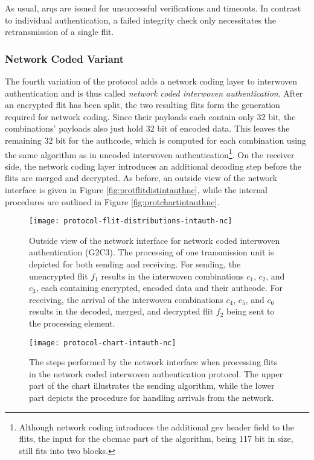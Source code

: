 As usual, \glspl{arq} are issued for unsuccessful verifications and timeouts. In contrast to individual authentication, a failed integrity check only
necessitates the retransmission of a single flit.

\subsubsection{Network Coded Variant}
The fourth variation of the protocol adds a network coding layer to interwoven authentication and is thus called \textit{network coded interwoven
authentication}. After an encrypted flit has been split, the two resulting flits form the generation required for network coding. Since their payloads
each contain only 32 bit, the combinations' payloads also just hold 32 bit of encoded data. This leaves the remaining 32 bit for the authcode, which is
computed for each combination using the same algorithm as in uncoded interwoven authentication\footnote{Although network coding introduces the
additional \gls{gev} header field to the flits, the input for the \gls{cbcmac} part of the algorithm, being 117 bit in size, still fits into two
blocks.}. On the receiver side, the network coding layer introduces an additional decoding step before the flits are merged and decrypted. As before,
an outside view of the network interface is given in Figure \vref{fig:protflitdistintauthnc}, while the internal procedures are outlined in Figure
\vref{fig:protchartintauthnc}.

\begin{figure}
    \centering
    \texttt{[image: protocol-flit-distributions-intauth-nc]}
    \caption[Network coded int. auth., outside view]{Outside view of the network interface for network coded interwoven authentication (G2C3). The
    processing of one transmission unit is depicted for both sending and receiving. For sending, the unencrypted flit $f_1$ results in the interwoven
    combinations $c_1$, $c_2$, and $c_3$, each containing encrypted, encoded data and their authcode. For receiving, the arrival of the interwoven
    combinations $c_4$, $c_5$, and $c_6$ results in the decoded, merged, and decrypted flit $f_2$ being sent to the processing element.}
    \label{fig:protflitdistintauthnc}
\end{figure}

\begin{figure}
    \centering
    \texttt{[image: protocol-chart-intauth-nc]}
    \caption[Network coded int. auth., detailed procedure]{The steps performed by the network interface when processing flits in the network coded
    interwoven authentication protocol. The upper part of the chart illustrates the sending algorithm, while the lower part depicts the procedure for
    handling arrivals from the network.}
    \label{fig:protchartintauthnc}
\end{figure}

